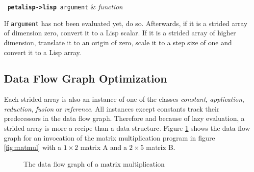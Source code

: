 \begin{function}
  \texttt{ \textbf{petalisp->lisp} argument} & \textsl{function} \\
\end{function}

If \texttt{argument} has not been evaluated yet, do so. Afterwards, if it
is a strided array of dimension zero, convert it to a Lisp scalar. If it is
a strided array of higher dimension, translate it to an origin of zero,
scale it to a step size of one and convert it to a Lisp array.

\subsection{Data Flow Graph Optimization}

Each strided array is also an instance of one of the classes
\emph{constant}, \emph{application}, \emph{reduction}, \emph{fusion} or
\emph{reference}. All instances except constants track their predecessors
in the data flow graph. Therefore and because of lazy evaluation, a strided
array is more a recipe than a data structure. Figure \ref{fig:matmul-graph}
shows the data flow graph for an invocation of the matrix multiplication
program in figure \ref{fig:matmul} with a $1\times 2$ matrix A and a
$2 \times 5$ matrix B.

\begin{figure}[htb]
\begin{center}
\end{center}
\caption{The data flow graph of a matrix multiplication}
\label{fig:matmul-graph}
\end{figure}

